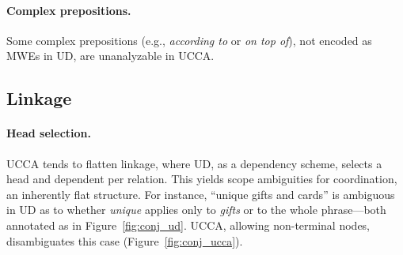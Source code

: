 \documentclass[11pt,a4paper,table]{article}
\begin{document}
\paragraph{Complex prepositions.} Some complex prepositions (e.g., \textit{according to} or \textit{on top of}),
      not encoded as MWEs in UD, are unanalyzable in UCCA.


\subsection{Linkage}\label{sec:linkage}

\paragraph{Head selection.}
UCCA tends to flatten linkage, where UD, as a dependency scheme,
selects a head and dependent per relation.
This yields scope ambiguities for coordination, an inherently flat structure. 
For instance, ``unique gifts and cards'' is ambiguous in UD as to whether
\textit{unique} applies only to \textit{gifts} or to the whole phrase---both
annotated as in Figure~\ref{fig:conj_ud}.
UCCA, allowing non-terminal nodes, disambiguates this case (Figure~\ref{fig:conj_ucca}).

\end{document}
